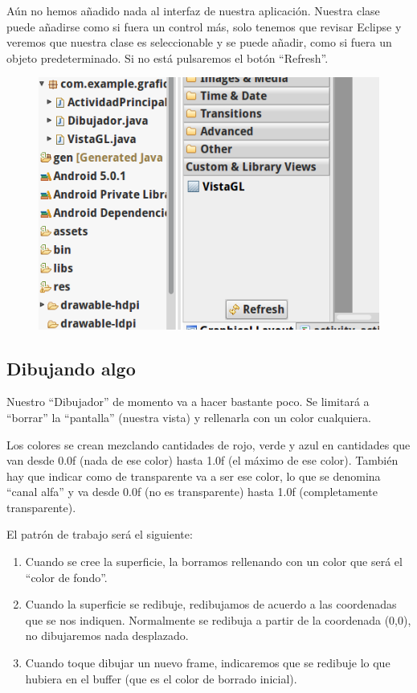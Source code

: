 \documentclass[a4paper,12pt,spanish]{sphinxmanual}
\begin{document}
Aún no hemos añadido nada al interfaz de nuestra aplicación. Nuestra clase  puede añadirse como si fuera un control más, solo tenemos que revisar Eclipse y veremos que nuestra clase es seleccionable y se puede añadir, como si fuera un objeto predeterminado. Si no está pulsaremos el botón ``Refresh''.
\begin{figure}[htbp]
\centering

\includegraphics{nuevocontroleclipse.png}
\end{figure}


\subsection{Dibujando algo}
\label{tema2:dibujando-algo}
Nuestro ``Dibujador'' de momento va a hacer bastante poco. Se limitará a ``borrar'' la ``pantalla'' (nuestra vista) y rellenarla con un color cualquiera.

Los colores se crean mezclando cantidades de rojo, verde y azul en cantidades que van desde 0.0f (nada de ese color) hasta 1.0f (el máximo de ese color). También hay que indicar como de transparente va a ser ese color, lo que se denomina ``canal alfa'' y va desde 0.0f (no es transparente) hasta 1.0f (completamente transparente).

El patrón de trabajo será el siguiente:
\begin{enumerate}
\item {} 
Cuando se cree la superficie, la borramos rellenando con un color que será el ``color de fondo''.

\item {} 
Cuando la superficie se redibuje, redibujamos de acuerdo a las coordenadas que se nos indiquen. Normalmente se redibuja a partir de la coordenada (0,0), no dibujaremos nada desplazado.

\item {} 
Cuando toque dibujar un nuevo frame, indicaremos que se redibuje lo que hubiera en el buffer (que es el color de borrado inicial).

\end{enumerate}
\end{document}
